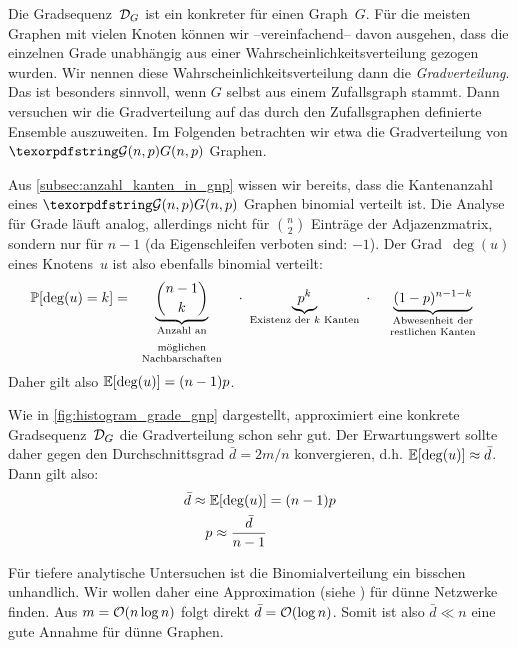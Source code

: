 Die Gradsequenz~$\mathcal{D}_G$ ist ein konkreter  für einen Graph~$G$.
Für die meisten Graphen mit vielen Knoten können wir --vereinfachend-- davon ausgehen, dass die einzelnen Grade unabhängig aus einer Wahrscheinlichkeitsverteilung gezogen wurden.
Wir  nennen diese Wahrscheinlichkeitsverteilung dann die \emph{Gradverteilung}.
Das ist besonders sinnvoll, wenn $G$ selbst aus einem Zufallsgraph stammt.
Dann versuchen wir die Gradverteilung auf das durch den Zufallsgraphen definierte Ensemble auszuweiten.
Im Folgenden betrachten wir etwa die Gradverteilung von $\Gnp$ Graphen.

Aus \cref{subsec:anzahl_kanten_in_gnp} wissen wir bereits, dass die Kantenanzahl eines $\Gnp$ Graphen binomial verteilt ist.
Die Analyse für Grade läuft analog, allerdings nicht für $\binom n 2$ Einträge der Adjazenzmatrix, sondern nur für $n-1$ (da Eigenschleifen verboten sind: $-1$).
Der Grad~$\deg(u)$ eines Knotens~$u$ ist also ebenfalls binomial verteilt:
\begin{align}
    \prob{\deg(u) = k} =
    \underbrace{\binom{n-1}{k}}_\text{\begin{minipage}{9em}\centering Anzahl an möglichen\\[-0.5em] Nachbarschaften\end{minipage}}
    \ \cdot \
    \underbrace{p^k}_\text{Existenz der $k$ Kanten}
    \ \cdot \
    \underbrace{(1-p)^{n-1-k}}_\text{\begin{minipage}{10em}\centering Abwesenheit der \\[-0.5em] restlichen Kanten\end{minipage}}
    \label{eq:gradverteilung_gnp}
\end{align}
Daher gilt also $\mathbb{E}\!\left[\deg(u)\right] = (n-1)p$.

Wie in \cref{fig:histogram_grade_gnp} dargestellt, approximiert eine konkrete Gradsequenz~$\mathcal{D}_G$ die Gradverteilung schon sehr gut.
Der Erwartungswert sollte daher gegen den Durchschnittsgrad $\bar d = 2m / n$ konvergieren, d.h. $\mathbb{E}\!\left[\deg(u)\right] \approx \bar d$.
Dann gilt also:
\begin{align}
    \bar d \approx \mathbb{E}\!\left[\deg(u)\right] & = (n-1)p \\
    p \approx \frac{\bar d}{n-1} \label{eq:gnp_p_von_avg_deg}
\end{align}

Für tiefere analytische Untersuchen ist die Binomialverteilung ein bisschen unhandlich.
Wir wollen daher eine Approximation (siehe \cite{barabasi2014network}) für dünne Netzwerke finden.
Aus $m = \mathcal{O}\!\left(n \log n\right)$ folgt direkt $\bar d = \mathcal{O}\!\left(\log n\right)$.
Somit ist also $\bar d \ll n$ eine gute Annahme für dünne Graphen.

